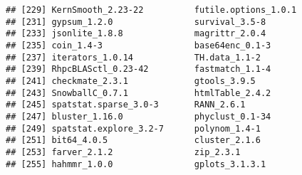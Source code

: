 \documentclass[
  11pt,
  a4paper,
]{article}
\begin{document}
\begin{verbatim}
## [229] KernSmooth_2.23-22          futile.options_1.0.1       
## [231] gypsum_1.2.0                survival_3.5-8             
## [233] jsonlite_1.8.8              magrittr_2.0.4             
## [235] coin_1.4-3                  base64enc_0.1-3            
## [237] iterators_1.0.14            TH.data_1.1-2              
## [239] RhpcBLASctl_0.23-42         fastmatch_1.1-4            
## [241] checkmate_2.3.1             gtools_3.9.5               
## [243] SnowballC_0.7.1             htmlTable_2.4.2            
## [245] spatstat.sparse_3.0-3       RANN_2.6.1                 
## [247] bluster_1.16.0              phyclust_0.1-34            
## [249] spatstat.explore_3.2-7      polynom_1.4-1              
## [251] bit64_4.0.5                 cluster_2.1.6              
## [253] farver_2.1.2                zip_2.3.1                  
## [255] hahmmr_1.0.0                gplots_3.1.3.1
\end{verbatim}
\end{document}
